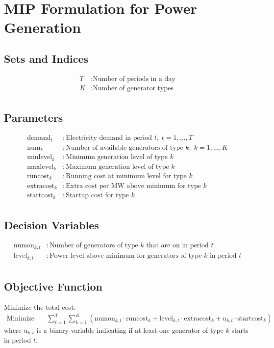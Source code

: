 \documentclass{article}
\begin{document}
\section*{MIP Formulation for Power Generation}

\subsection*{Sets and Indices}
\begin{align*}
T & : \text{Number of periods in a day} \\
K & : \text{Number of generator types} \\
\end{align*}

\subsection*{Parameters}
\begin{align*}
\text{demand}_{t} & : \text{Electricity demand in period } t, \; t=1,\dots,T \\
\text{num}_{k} & : \text{Number of available generators of type } k, \; k=1,\dots,K \\
\text{minlevel}_{k} & : \text{Minimum generation level of type } k \\
\text{maxlevel}_{k} & : \text{Maximum generation level of type } k \\
\text{runcost}_{k} & : \text{Running cost at minimum level for type } k \\
\text{extracost}_{k} & : \text{Extra cost per MW above minimum for type } k \\
\text{startcost}_{k} & : \text{Startup cost for type } k \\
\end{align*}

\subsection*{Decision Variables}
\begin{align*}
\text{numon}_{k,t} & : \text{Number of generators of type } k \text{ that are on in period } t \\
\text{level}_{k,t} & : \text{Power level above minimum for generators of type } k \text{ in period } t \\
\end{align*}

\subsection*{Objective Function}
Minimize the total cost:
\begin{align*}
\text{Minimize} \quad & \sum_{t=1}^{T} \sum_{k=1}^{K} \left( \text{numon}_{k,t} \cdot \text{runcost}_{k} + \text{level}_{k,t} \cdot \text{extracost}_{k} + \text{u}_{k,t} \cdot \text{startcost}_{k} \right)
\end{align*}
where \( \text{u}_{k,t} \) is a binary variable indicating if at least one generator of type \( k \) starts in period \( t \).
\end{document}
